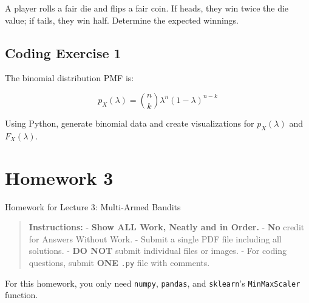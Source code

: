 \documentclass[
  letterpaper,
  DIV=11,
  numbers=noendperiod]{scrreprt}
\makeatletter
\newcommand*\pandocbounded[1]{%
  \sbox\pandoc@box{#1}%
  \Gscale@div\@tempa{\textheight}{\dimexpr\ht\pandoc@box+\dp\pandoc@box\relax}%
  \Gscale@div\@tempb{\linewidth}{\wd\pandoc@box}%
  \ifdim\@tempb\p@<\@tempa\p@\let\@tempa\@tempb\fi%
  \ifdim\@tempa\p@<\p@\scalebox{\@tempa}{\usebox\pandoc@box}%
  \else\usebox{\pandoc@box}%
  \fi%
}
\makeatother
\begin{document}
A player rolls a fair die and flips a fair coin. If heads, they win
twice the die value; if tails, they win half. Determine the expected
winnings.

\section{Coding Exercise 1}\label{coding-exercise-1}

The binomial distribution PMF is:

\[
p_X(\lambda) = {n \choose k} \lambda^n (1-\lambda)^{n-k}
\]

Using Python, generate binomial data and create visualizations for
\(p_X(\lambda)\) and \(F_X(\lambda)\).

\section{\texorpdfstring{\href{https://colab.research.google.com/drive/1aA2D9X1oTxvi1BPl5TqSZ_2rKDOUIIHD?usp=sharing}{\protect\pandocbounded{}}}{}}\label{section}

\chapter{Homework 3}\label{homework-3}

\begin{tcolorbox}[enhanced jigsaw, arc=.35mm, toprule=.15mm, leftrule=.75mm, colback=white, left=2mm, colframe=quarto-callout-note-color-frame, rightrule=.15mm, opacityback=0, breakable, bottomrule=.15mm]

Homework for Lecture 3: Multi-Armed Bandits 📝

\end{tcolorbox}

\begin{quote}
\textbf{Instructions:} - \textbf{Show ALL Work, Neatly and in Order.} -
\textbf{No} credit for Answers Without Work. - Submit a single PDF file
including all solutions. - \textbf{DO NOT} submit individual files or
images. - For coding questions, submit \textbf{ONE} \texttt{.py} file
with comments.
\end{quote}

\begin{tcolorbox}[enhanced jigsaw, toprule=.15mm, leftrule=.75mm, coltitle=black, left=2mm, opacityback=0, titlerule=0mm, arc=.35mm, toptitle=1mm, opacitybacktitle=0.6, bottomtitle=1mm, colframe=quarto-callout-note-color-frame, title=\textcolor{quarto-callout-note-color}{\faInfo}\hspace{0.5em}{Note}, rightrule=.15mm, bottomrule=.15mm, colbacktitle=quarto-callout-note-color!10!white, breakable, colback=white]

For this homework, you only need \texttt{numpy}, \texttt{pandas}, and
\texttt{sklearn}'s \texttt{MinMaxScaler} function.

\end{tcolorbox}
\end{document}
